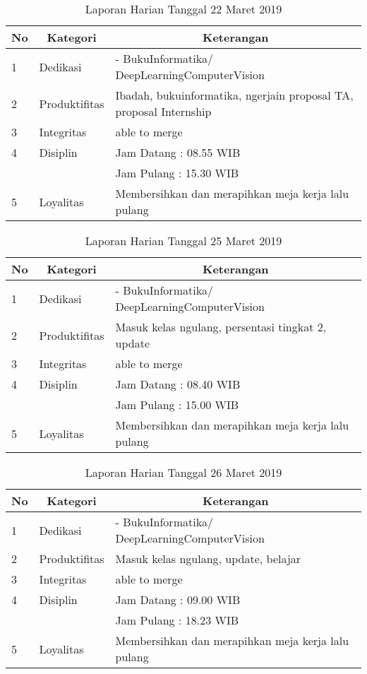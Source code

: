 \begin{table}[htp]
\caption{Laporan Harian Tanggal 22 Maret 2019}
\label{tab:lh220319}
\begin{tabular}{|l|l|l|}
\hline
\textbf{No} & \multicolumn{1}{c|}{\textbf{Kategori}} & \multicolumn{1}{c|}{\textbf{Keterangan}} \\ \hline
1 & Dedikasi & - BukuInformatika/ DeepLearningComputerVision \\ \hline
2 & Produktifitas & Ibadah, bukuinformatika, ngerjain proposal TA, proposal Internship  \\
3 & Integritas & able to merge \\ \hline
4 & Disiplin & Jam Datang : 08.55 WIB \\
 &  & Jam Pulang : 15.30 WIB \\ \hline
5 & Loyalitas & Membersihkan dan merapihkan meja kerja lalu pulang  \\ \hline
\end{tabular}
\end{table}

\begin{table}[htp]
\caption{Laporan Harian Tanggal 25 Maret 2019}
\label{tab:lh250319}
\begin{tabular}{|l|l|l|}
\hline
\textbf{No} & \multicolumn{1}{c|}{\textbf{Kategori}} & \multicolumn{1}{c|}{\textbf{Keterangan}} \\ \hline
1 & Dedikasi & - BukuInformatika/ DeepLearningComputerVision \\ \hline
2 & Produktifitas & Masuk kelas ngulang, persentasi tingkat 2, update  \\
3 & Integritas & able to merge \\ \hline
4 & Disiplin & Jam Datang : 08.40 WIB \\
 &  & Jam Pulang : 15.00 WIB \\ \hline
5 & Loyalitas & Membersihkan dan merapihkan meja kerja lalu pulang  \\ \hline
\end{tabular}
\end{table}

\begin{table}[htp]
\caption{Laporan Harian Tanggal 26 Maret 2019}
\label{tab:lh260319}
\begin{tabular}{|l|l|l|}
\hline
\textbf{No} & \multicolumn{1}{c|}{\textbf{Kategori}} & \multicolumn{1}{c|}{\textbf{Keterangan}} \\ \hline
1 & Dedikasi & - BukuInformatika/ DeepLearningComputerVision \\ \hline
2 & Produktifitas & Masuk kelas ngulang, update, belajar  \\
3 & Integritas & able to merge \\ \hline
4 & Disiplin & Jam Datang : 09.00 WIB \\
 &  & Jam Pulang : 18.23 WIB \\ \hline
5 & Loyalitas & Membersihkan dan merapihkan meja kerja lalu pulang  \\ \hline
\end{tabular}
\end{table}

